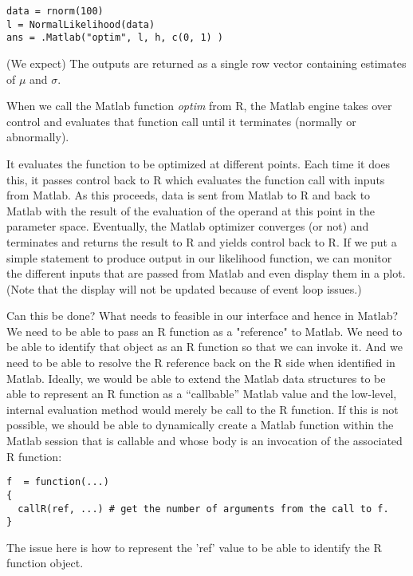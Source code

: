 \documentclass{article}
\def\MatlabFun#1{\textsl{#1}}
\begin{document}
\begin{verbatim}
data = rnorm(100)
l = NormalLikelihood(data)
ans = .Matlab("optim", l, h, c(0, 1) )
\end{verbatim}


(We expect) The outputs are returned as a single row vector containing
estimates of $\mu$ and $\sigma$.

When we call the Matlab function \MatlabFun{optim} from R,
the Matlab engine takes over control and evaluates that
function call until it terminates (normally or abnormally).

It evaluates the function to be optimized at different points.  Each
time it does this, it passes control back to R which evaluates the
function call with inputs from Matlab.  As this proceeds, data is sent
from Matlab to R and back to Matlab with the result of the evaluation
of the operand at this point in the parameter space.  Eventually, the
Matlab optimizer converges (or not) and terminates and returns the
result to R and yields control back to R.  If we put a simple
statement to produce output in our likelihood function, we can monitor
the different inputs that are passed from Matlab and even display them
in a plot.  (Note that the display will not be updated because of
event loop issues.)


Can this be done? What needs to feasible in our interface and hence in
Matlab?  We need to be able to pass an R function as a "reference" to
Matlab.  We need to be able to identify that object as an R function
so that we can invoke it.  And we need to be able to resolve the R
reference back on the R side when identified in Matlab.  Ideally, we
would be able to extend the Matlab data structures to be able to
represent an R function as a ``callbable'' Matlab value and the
low-level, internal evaluation method would merely be call to the R
function.  If this is not possible, we should be able to dynamically
create a Matlab function within the Matlab session that is callable
and whose body is an invocation of the associated R function:
\begin{verbatim}
f  = function(...)
{
  callR(ref, ...) # get the number of arguments from the call to f.
}
\end{verbatim}
The issue here is how to represent the 'ref' value to 
be able to identify the R function object.

\nocite{*}



\end{document}
